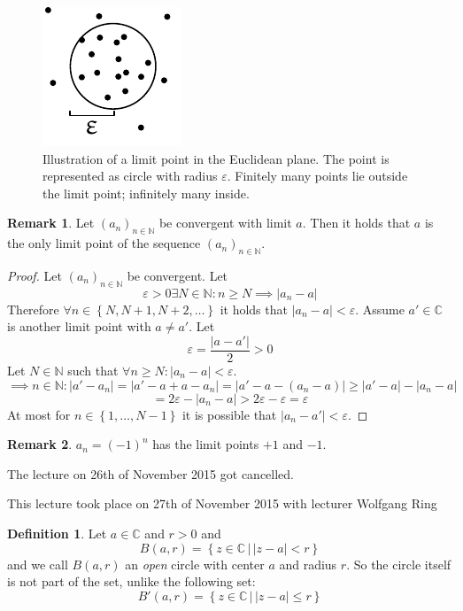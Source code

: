 \documentclass[a4paper,landscape,twocolumn]{article}
\theoremstyle{definition}
\newtheorem{defi}{Definition}
\newtheorem{rem}{Remark}
\newcommand\set[1]{\left\{#1\right\}}
\newcommand\setdef[2]{\left\{#1\,|\,#2\right\}}
\newcommand\abs[1]{\left|#1\right|}
\newcommand\seq[1]{{\left(#1\right)}_{n \in \mathbb N}}
\newcommand\meta[3]{\begin{mdframed}[skipbelow=4pt,skipabove=4pt,innermargin=1pt,innerleftmargin=1pt,innerrightmargin=1pt]\begin{center}\small{\textdownarrow{} This #1 took place on #2 with lecturer #3}\end{center}\end{mdframed}}
\begin{document}
\begin{figure}[!t]
  \begin{center}
    \includegraphics{img/limit_point.pdf}
    \caption{
      Illustration of a limit point in the Euclidean plane.
      The point is represented as circle with radius $\varepsilon$.
      Finitely many points lie outside the limit point; infinitely many inside.
    }
  \end{center}
\end{figure}

\begin{rem}
  Let $\seq{a_n}$ be convergent with limit $a$.
  Then it holds that $a$ is the only limit point of the sequence $\seq{a_n}$.
\end{rem}

\begin{proof}
  Let $\seq{a_n}$ be convergent. Let
  \[ \varepsilon > 0 \exists N \in \mathbb N: n \geq N \implies \abs{a_n - a} \]
  Therefore $\forall n \in \set{N, N+1, N+2, \dots}$ it holds that $\abs{a_n - a} < \varepsilon$.
  Assume $a' \in \mathbb C$ is another limit point with $a \neq a'$.
  Let
  \[ \varepsilon = \frac{\abs{a - a'}}{2} > 0 \]
  Let $N \in \mathbb N$ such that $\forall n \geq N: \abs{a_n - a} < \varepsilon$.
  \[
    \implies n \in \mathbb N: \abs{a' - a_n}
      = \abs{a' - a + a - a_n}
      = \abs{a' - a - (a_n - a)} \geq \abs{a' - a} - \abs{a_n - a}
  \] \[
      = 2\varepsilon - \abs{a_n - a} > 2\varepsilon - \varepsilon
      = \varepsilon
  \]
  At most for $n \in \set{1, \dots, N-1}$ it is possible that $\abs{a_n - a'} < \varepsilon$.
\end{proof}

\begin{rem}
  $a_n = (-1)^n$ has the limit points $+1$ and $-1$.
\end{rem}

The lecture on 26th of November 2015 got cancelled.

\meta{lecture}{27th of November 2015}{Wolfgang Ring}

\begin{defi}
  Let $a \in \mathbb C$ and $r > 0$ and
  \[ B(a, r) = \setdef{z \in \mathbb C}{\abs{z - a} < r} \]
  and we call $B(a, r)$ an \emph{open} circle with center $a$ and radius $r$.
  So the circle itself is not part of the set, unlike the following set:
  \[ B'(a, r) = \setdef{z \in \mathbb C}{\abs{z - a} \leq r} \]
\end{defi}
\end{document}
